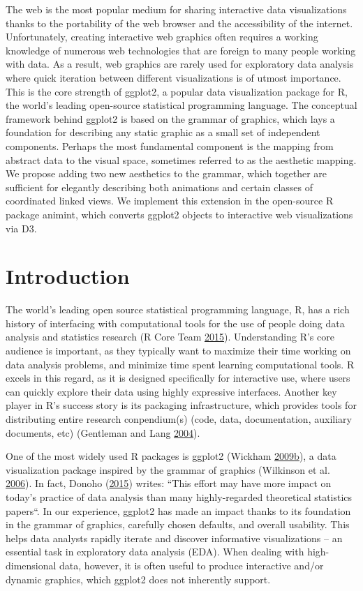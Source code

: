 \documentclass[12pt,]{isuthesis}
\begin{document}
The web is the most popular medium for sharing interactive data
visualizations thanks to the portability of the web browser and the
accessibility of the internet. Unfortunately, creating interactive web
graphics often requires a working knowledge of numerous web technologies
that are foreign to many people working with data. As a result, web
graphics are rarely used for exploratory data analysis where quick
iteration between different visualizations is of utmost importance. This
is the core strength of ggplot2, a popular data visualization package
for R, the world's leading open-source statistical programming language.
The conceptual framework behind ggplot2 is based on the grammar of
graphics, which lays a foundation for describing any static graphic as a
small set of independent components. Perhaps the most fundamental
component is the mapping from abstract data to the visual space,
sometimes referred to as the aesthetic mapping. We propose adding two
new aesthetics to the grammar, which together are sufficient for
elegantly describing both animations and certain classes of coordinated
linked views. We implement this extension in the open-source R package
animint, which converts ggplot2 objects to interactive web
visualizations via D3.

\section{Introduction}
\label{sec:intro}

The world's leading open source statistical programming language, R, has
a rich history of interfacing with computational tools for the use of
people doing data analysis and statistics research (R Core Team
\protect\hyperlink{ref-RCore}{2015}). Understanding R's core audience is
important, as they typically want to maximize their time working on data
analysis problems, and minimize time spent learning computational tools.
R excels in this regard, as it is designed specifically for interactive
use, where users can quickly explore their data using highly expressive
interfaces. Another key player in R's success story is its packaging
infrastructure, which provides tools for distributing entire research
conpendium(s) (code, data, documentation, auxiliary documents, etc)
(Gentleman and Lang \protect\hyperlink{ref-Gentleman:Lang}{2004}).

One of the most widely used R packages is ggplot2 (Wickham
\protect\hyperlink{ref-ggplot2-book}{2009}\protect\hyperlink{ref-ggplot2-book}{b}),
a data visualization package inspired by the grammar of graphics
(Wilkinson et al. \protect\hyperlink{ref-wilkinson}{2006}). In fact,
Donoho (\protect\hyperlink{ref-Donoho:2015tu}{2015}) writes: ``This
effort may have more impact on today's practice of data analysis than
many highly-regarded theoretical statistics papers``. In our experience,
ggplot2 has made an impact thanks to its foundation in the grammar of
graphics, carefully chosen defaults, and overall usability. This helps
data analysts rapidly iterate and discover informative visualizations --
an essential task in exploratory data analysis (EDA). When dealing with
high-dimensional data, however, it is often useful to produce
interactive and/or dynamic graphics, which ggplot2 does not inherently
support.
\end{document}
